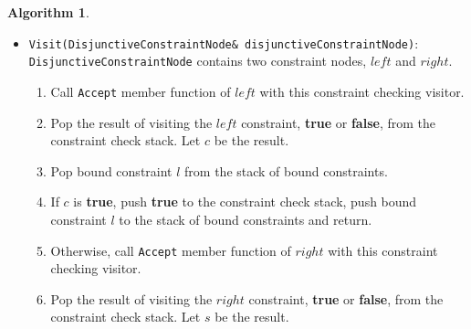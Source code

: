 \documentclass[a4paper,oneside,11pt]{book}
\theoremstyle{definition}
\newtheorem{algo}{Algorithm}[section]
\begin{document}
\begin{algo}
\begin{itemize}
\begin{enumerate}
\begin{enumerate}
\begin{enumerate}
Call the \verb|Accept| member function of $t$ with this constraint checker visitor.
\item
If the \emph{resolvedType} is not null:
\begin{itemize}
\item
Add \emph{resolvedType} to the list of type arguments $a$.
\end{itemize}
\end{enumerate}
\item
Compute a 16-byte $conceptId$ using algorithm \ref{computeconceptid} for the concept symbol $s$ and list of type arguments $a$.
\item
Lookup $conceptId$ from the concept repository (section \ref{conceptrepository}).
\item
If found, push \textbf{true} to the constraint check stack.
\item
Otherwise, instantiate concept $s$ with type arguments $a$ using algorithm \ref{instantiateconcept}.
Let $c$ be the instantiated concept.
\item
If $c$ is not null, add $c$ to the concept repository with id $conceptId$, and push \textbf{true} to the constraint check stack.
\item
Otherwise, push \textbf{false} to the constraint check stack.
\end{enumerate}
\end{enumerate}
\item
\verb|Visit(DisjunctiveConstraintNode& disjunctiveConstraintNode)|:\\
\verb|DisjunctiveConstraintNode| contains two constraint nodes, $left$ and $right$.
\begin{enumerate}
\item
Call \verb|Accept| member function of $left$ with this constraint checking visitor.
\item
Pop the result of visiting the $left$ constraint, \textbf{true} or \textbf{false}, from the constraint check stack. Let $c$ be the result.
\item
Pop bound constraint $l$ from the stack of bound constraints.
\item
If $c$ is \textbf{true}, push \textbf{true} to the constraint check stack, push bound constraint $l$ to the stack of bound constraints and return.
\item
Otherwise, call \verb|Accept| member function of $right$ with this constraint checking visitor.
\item
Pop the result of visiting the $right$ constraint, \textbf{true} or \textbf{false}, from the constraint check stack. Let $s$ be the result.

\end{enumerate}
\end{itemize}
\end{algo}
\end{document}
